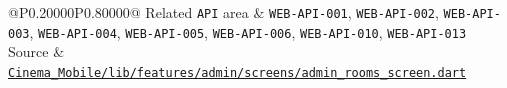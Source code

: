 \begin{longtable}{@{}P{0.20000\SRSWidth}P{0.80000\SRSWidth}@{}}
Related \texttt{API} area & \texttt{WEB-\allowbreak{}API-\allowbreak{}001}, \texttt{WEB-\allowbreak{}API-\allowbreak{}002}, \texttt{WEB-\allowbreak{}API-\allowbreak{}003}, \texttt{WEB-\allowbreak{}API-\allowbreak{}004}, \texttt{WEB-\allowbreak{}API-\allowbreak{}005}, \texttt{WEB-\allowbreak{}API-\allowbreak{}006}, \texttt{WEB-\allowbreak{}API-\allowbreak{}010}, \texttt{WEB-\allowbreak{}API-\allowbreak{}013} \\[3pt]
Source & \href{../../../Cinema\_Mobile/lib/features/admin/screens/admin\_rooms\_screen.dart}{\texttt{Cinema\_\allowbreak{}Mobile/\allowbreak{}lib/\allowbreak{}features\allowbreak{}/\allowbreak{}admin/\allowbreak{}screens/\allowbreak{}admin\_\allowbreak{}rooms\_\allowbreak{}screen.\allowbreak{}dart}} \\[3pt]
\end{longtable}
\endgroup

